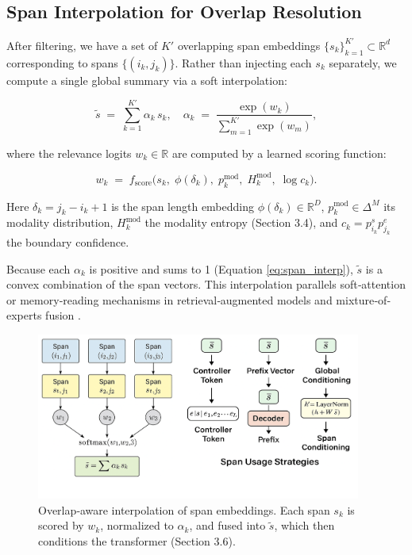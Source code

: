 \subsection{Span Interpolation for Overlap Resolution}

After filtering, we have a set of \(K'\) overlapping span embeddings
\(\{s_k\}_{k=1}^{K'}\subset\mathbb{R}^d\) corresponding to spans \(\{(i_k,j_k)\}\).  Rather than injecting each \(s_k\) separately, we compute a single global summary via a soft interpolation:

\begin{equation}
	\tilde s \;=\;
	\sum_{k=1}^{K'} \alpha_k\,s_k,
	\quad
	\alpha_k \;=\;\frac{\exp(w_k)}{\sum_{m=1}^{K'}\exp(w_m)},
	\label{eq:span_interp}
\end{equation}

where the relevance logits \(w_k\in\mathbb{R}\) are computed by a learned scoring function:

\begin{equation}
	w_k \;=\; f_{\mathrm{score}}\bigl(
	s_k,\;\phi(\delta_k),\;p^{\mathrm{mod}}_k,\;H^{\mathrm{mod}}_k,\;\log c_k
	\bigr).
	\label{eq:relevance_score}
\end{equation}

Here  
\(\delta_k=j_k-i_k+1\)  
is the span length embedding \(\phi(\delta_k)\in\mathbb{R}^D\),  
\(p^{\mathrm{mod}}_k\in\Delta^M\) its modality distribution,  
\(H^{\mathrm{mod}}_k\) the modality entropy (Section 3.4),  
and \(c_k=p^s_{i_k}p^e_{j_k}\) the boundary confidence.  

Because each \(\alpha_k\) is positive and sums to 1 (Equation \ref{eq:span_interp}), \(\tilde s\) is a convex combination of the span vectors.  This interpolation parallels soft‐attention or memory‐reading mechanisms in retrieval‐augmented models \cite{guu2020retrieval,izacard2020distilling} and mixture‐of‐experts fusion \cite{arora2022exsum}.

\begin{figure}[t]
	\centering
	\includegraphics[width=0.95\textwidth]{figures/figure_1.png}
	\caption{Overlap‐aware interpolation of span embeddings.  Each span \(s_k\) is scored by \(w_k\), normalized to \(\alpha_k\), and fused into \(\tilde s\), which then conditions the transformer (Section 3.6).}
	\label{fig:span_interpolation}
\end{figure}


